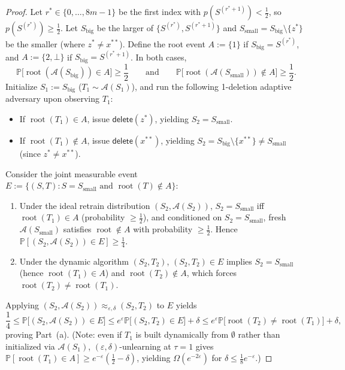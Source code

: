 \documentclass[11pt]{article}
\theoremstyle{definition}
\newcommand{\Prob}{\mathbb{P}}
\newcommand{\calA}{\mathcal{A}}
\begin{document}
\begin{proof}
Let $r^* \in \{0, \dots, 8m-1\}$ be the first index with $p(S^{(r^*+1)}) < \frac{1}{2}$, so $p(S^{(r^*)}) \ge \frac{1}{2}$. Let $S_{\mathrm{big}}$ be the larger of $\{S^{(r^*)}, S^{(r^*+1)}\}$ and $S_{\mathrm{small}} = S_{\mathrm{big}} \setminus \{z^*\}$ be the smaller (where $z^* \ne x^{**}$). Define the root event $A := \{1\}$ if $S_{\mathrm{big}} = S^{(r^*)}$, and $A := \{2, \bot\}$ if $S_{\mathrm{big}} = S^{(r^*+1)}$. In both cases,
\[
    \Prob\big[\operatorname{root}(\calA(S_{\mathrm{big}})) \in A\big] \ge \frac{1}{2} \qquad \text{and} \qquad \Prob\big[\operatorname{root}(\calA(S_{\mathrm{small}})) \notin A\big] \ge \frac{1}{2}.
\]
Initialize $S_1 := S_{\mathrm{big}}$ ($T_1 \sim \calA(S_1)$), and run the following 1-deletion adaptive adversary upon observing $T_1$:
\begin{itemize}[leftmargin=1.5em,itemsep=1pt]
    \item If $\operatorname{root}(T_1) \in A$, issue $\mathsf{delete}(z^*)$, yielding $S_2 = S_{\mathrm{small}}$.
    \item If $\operatorname{root}(T_1) \notin A$, issue $\mathsf{delete}(x^{**})$, yielding $S_2 = S_{\mathrm{big}} \setminus \{x^{**}\} \ne S_{\mathrm{small}}$ (since $z^* \ne x^{**}$).
\end{itemize}
Consider the joint measurable event $E := \{(S, T) : S = S_{\mathrm{small}} \text{ and } \operatorname{root}(T) \notin A\}$:
\begin{enumerate}[leftmargin=1.5em,itemsep=1pt]
    \item Under the ideal retrain distribution $(S_2, \calA(S_2))$, $S_2 = S_{\mathrm{small}}$ iff $\operatorname{root}(T_1) \in A$ (probability $\ge \frac{1}{2}$), and conditioned on $S_2 = S_{\mathrm{small}}$, fresh $\calA(S_{\mathrm{small}})$ satisfies $\operatorname{root} \notin A$ with probability $\ge \frac{1}{2}$. Hence $\Prob[(S_2, \calA(S_2)) \in E] \ge \frac{1}{4}$.
    \item Under the dynamic algorithm $(S_2, T_2)$, $(S_2, T_2) \in E$ implies $S_2 = S_{\mathrm{small}}$ (hence $\operatorname{root}(T_1) \in A$) and $\operatorname{root}(T_2) \notin A$, which forces $\operatorname{root}(T_2) \ne \operatorname{root}(T_1)$.
\end{enumerate}
Applying $(S_2, \calA(S_2)) \approx_{\varepsilon, \delta} (S_2, T_2)$ to $E$ yields
\[
    \frac{1}{4} \le \Prob\big[(S_2, \calA(S_2)) \in E\big] \le e^\varepsilon \Prob\big[(S_2, T_2) \in E\big] + \delta \le e^\varepsilon \Prob\big[\operatorname{root}(T_2) \ne \operatorname{root}(T_1)\big] + \delta,
\]
proving Part~(a). (Note: even if $T_1$ is built dynamically from $\emptyset$ rather than initialized via $\calA(S_1)$, $(\varepsilon, \delta)$-unlearning at $\tau = 1$ gives $\Prob[\operatorname{root}(T_1) \in A] \ge e^{-\varepsilon}(\frac{1}{2} - \delta)$, yielding $\Omega(e^{-2\varepsilon})$ for $\delta \le \frac{1}{8}e^{-\varepsilon}$.)


\end{proof}
\end{document}
